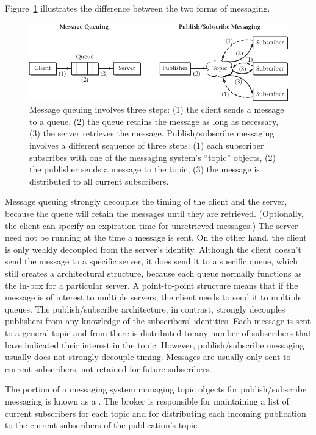 Figure~\ref{scan-10-1} illustrates the difference between the two
forms of messaging.
\begin{figure}
\centerline{\includegraphics{hail_f1001}}
\caption{Message queuing involves three steps: (1) the client sends a
message to a queue, (2) the queue retains the message as long as
necessary, (3) the server retrieves the message.  Publish/subscribe
messaging involves a different sequence of three steps: (1) each subscriber
subscribes with one of the messaging system's ``topic'' objects, (2) the
publisher sends a message to the topic, (3) the message is
distributed to all current subscribers.}
\label{scan-10-1}
\end{figure}
Message queuing strongly decouples the timing of the client and the
server, because the queue will retain the messages until they are
retrieved.  (Optionally, the client can specify an expiration time for
unretrieved messages.)  The server need not be running at the time a
message is sent. On the other hand, the client is only weakly
decoupled from the server's identity. Although the client doesn't send
the message to a specific server, it does send it to a specific queue,
which still creates a  architectural structure, because each
queue normally functions as the in-box for a particular server.  A
point-to-point structure means that if the
message is of interest to multiple servers, the client needs to
send it to multiple queues.  The publish/subscribe architecture, in
contrast, strongly decouples publishers from any knowledge of the
subscribers' identities.  Each message is sent to a general topic and
from there is distributed to any number of subscribers that have
indicated their interest in the topic.  However, publish/subscribe
messaging usually does not strongly decouple timing.  Messages are usually only
sent to current subscribers, not retained for future subscribers.

The portion of a messaging system managing topic objects for
publish/subscribe messaging is known as a .  The broker
is responsible for maintaining a list of current subscribers for each
topic and for distributing each incoming publication to the current
subscribers of the publication's topic.

